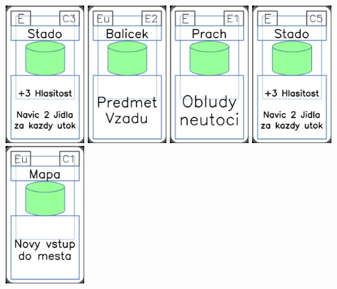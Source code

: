 \documentclass[a4paper]{article}
\begin{document}
	\includegraphics[width=3.0cm]{img-4_42}
	\includegraphics[width=3.0cm]{img-4_21}
	\includegraphics[width=3.0cm]{img-4_50}
	\includegraphics[width=3.0cm]{img-4_44}
	\includegraphics[width=3.0cm]{img-4_40}
\end{document}
